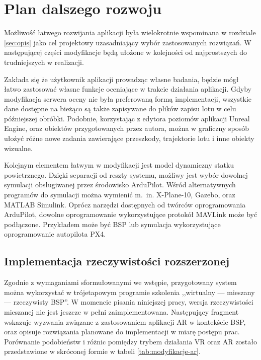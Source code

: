 \newpage
\section{Plan dalszego rozwoju}
Możliwość łatwego rozwijania aplikacji była wielokrotnie wspominana w rozdziale \ref{sec:opis} jako cel projektowy uzasadniający wybór zastosowanych rozwiązań. W następującej części modyfikacje będą ułożone w kolejności od najprostszych do trudniejszych w realizacji.

Zakłada się że użytkownik aplikacji prowadząc własne badania, będzie mógł łatwo zastosować własne funkcje oceniające w trakcie działania aplikacji. Gdyby modyfikacja serwera oceny nie była preferowaną formą implementacji, wszystkie dane dostępne na bieżąco są także zapisywane do plików zapisu lotu w celu późniejszej obróbki. Podobnie, korzystając z edytora poziomów aplikacji Unreal Engine, oraz obiektów przygotowanych przez autora, można w graficzny sposób ułożyć różne nowe zadania zawierające przeszkody, trajektorie lotu i inne obiekty wizualne.

Kolejnym elementem łatwym w modyfikacji jest model dynamiczny statku powietrznego. Dzięki separacji od reszty systemu, możliwy jest wybór dowolnej symulacji obsługiwanej przez środowisko ArduPilot. Wśród alternatywnych programów do symulacji można wymienić m.~in. X-Plane-10, Gazebo, oraz MATLAB Simulink. Oprócz narzędzi dostępnych od twórców oprogramowania ArduPilot, dowolne oprogramowanie wykorzystujące protokół MAVLink może być podłączone. Przykładem może być BSP lub symulacja wykorzystujące oprogramowanie autopilota PX4.


\subsection{Implementacja rzeczywistości rozszerzonej}
Zgodnie z wymaganiami sformułowanymi we wstępie, przygotowany system można wykorzystać w trójetapowym programie szkolenia ,,wirtualny --- mieszany --- rzeczywisty BSP''. W momencie pisania niniejszej pracy, wersja rzeczywistości mieszanej nie jest jeszcze w pełni zaimplementowana. Następujący fragment wskazuje wyzwania związane z zastosowaniem aplikacji AR w kontekście BSP, oraz opisuje rozwiązania planowane do implementacji w miarę postępu prac. Porównanie podobieństw i różnic pomiędzy trybem działania VR oraz AR zostało przedstawione w skróconej formie w tabeli \ref{tab:modyfikacje-ar}.

